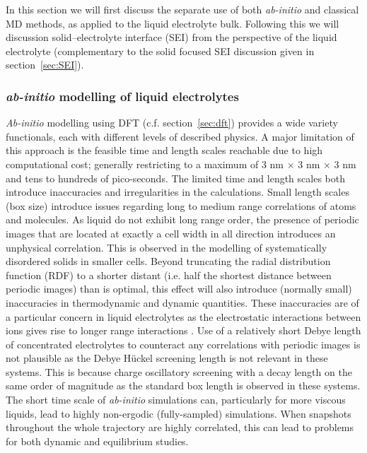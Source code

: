 \documentclass[../main.tex]{subfiles}
\begin{document}
In this section we will first discuss the separate use of both \textit{ab-initio} and classical MD methods, as applied to the liquid electrolyte bulk. Following this we will discussion solid--electrolyte interface (SEI) from the perspective of the liquid electrolyte (complementary to the solid focused SEI discussion given in section~\ref{sec:SEI}).

\subsubsection{\textit{ab-initio} modelling of liquid electrolytes}
\textit{Ab-initio} modelling using DFT (c.f. section~\ref{sec:dft}) provides a wide variety functionals, each with different levels of described physics. A major limitation of this approach is the feasible time and length scales reachable due to high computational cost; generally restricting to a maximum of 3 nm $\times$ 3 nm $\times$ 3 nm and tens to hundreds of pico-seconds. The limited time and length scales both introduce inaccuracies and irregularities in the calculations. Small length scales (box size) introduce issues regarding long to medium range correlations of atoms and molecules. As liquid do not exhibit long range order, the presence of periodic images that are located at exactly a cell width in all direction introduces an unphysical correlation. This is observed in the modelling of systematically disordered solids in smaller cells. Beyond truncating the radial distribution function (RDF) to a shorter distant (i.e. half the shortest distance between periodic images) than is optimal, this effect will also introduce (normally small) inaccuracies in thermodynamic and dynamic quantities\cite{Binder2009book, yeh_system-size_2004,botan_diffusion_2015,horbach_finite_1996}. These inaccuracies are of a particular concern in liquid electrolytes as the electrostatic interactions between ions gives rise to longer range interactions \cite{coles_correlation_2020}. Use of a relatively short Debye length of concentrated electrolytes to counteract any correlations with periodic images is not plausible as the Debye H\"{u}ckel screening length is not relevant in these systems. This is because charge oscillatory screening with a decay length on the same order of magnitude as the standard box length is observed in these systems\cite{coles_correlation_2020}. The short time scale of \textit{ab-initio} simulations can, particularly for more viscous liquids, lead to highly non-ergodic (fully-sampled) simulations. When snapshots throughout the whole trajectory are highly correlated\cite{frenkel_understanding_2002}, this can lead to problems for both dynamic and equilibrium studies. 
\end{document}
